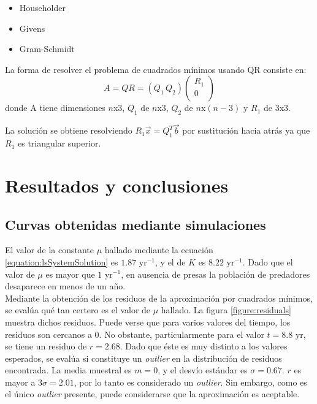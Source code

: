 \documentclass[journal, monochrome]{IEEEtran}
\begin{document}
\begin{itemize}
\item Householder
\item Givens
\item Gram-Schmidt
\end{itemize}
\par
La forma de resolver el problema de cuadrados mínimos usando QR consiste en:
\begin{equation}
A = QR = (Q_{1} \, Q_{2}) \left( \begin{array}{c}
R_{1} \\
0 \\
\end{array} \right)
\end{equation}
donde A tiene dimensiones $n$x$3$, $Q_{1}$ de $n$x$3$, $Q_{2}$ de $n$x$(n-3)$ y $R_{1}$ de $3$x$3$.
\par
La solución se obtiene resolviendo $R_{1}\vec{x} = Q_{1}^{T}\vec{b} $ por sustitución hacia atrás ya que $R_{1}$ es triangular superior.


\vspace{0.5cm}
\section{Resultados y conclusiones}
\label{section:results}

\subsection{Curvas obtenidas mediante simulaciones}

El valor de la constante $\mu$ hallado mediante la ecuación \ref{equation:lsSystemSolution} es $1.87 \text{ yr}^{-1}$, y el de $K$ es $8.22 \text{ yr}^{-1}$. Dado que el valor de $\mu$ es mayor que $1 \text{ yr}^{-1}$, 
en ausencia de presas la población de predadores desaparece en menos de un año.\\

Mediante la obtención de los residuos de la aproximación por cuadrados mínimos, se evalúa qué tan certero es el valor de $\mu$ hallado. La figura \ref{figure:residuals} muestra dichos residuos. 
Puede verse que para varios valores del tiempo, los residuos son cercanos a $0$. No obstante, particularmente para el valor $t = 8.8 \text{ yr}$, se tiene un residuo de $r = 2.68$. Dado que éste es muy distinto a los valores esperados, se evalúa si constituye un \textit{outlier} en la distribución de residuos encontrada. La media muestral es $m = 0$, y el desvío estándar es $\sigma = 0.67$. $r$ es mayor a $3 \sigma = 2.01$, por lo tanto es considerado un \textit{outlier}. Sin embargo, como es el único \textit{outlier} presente, puede considerarse que la aproximación es aceptable.\\
\end{document}
